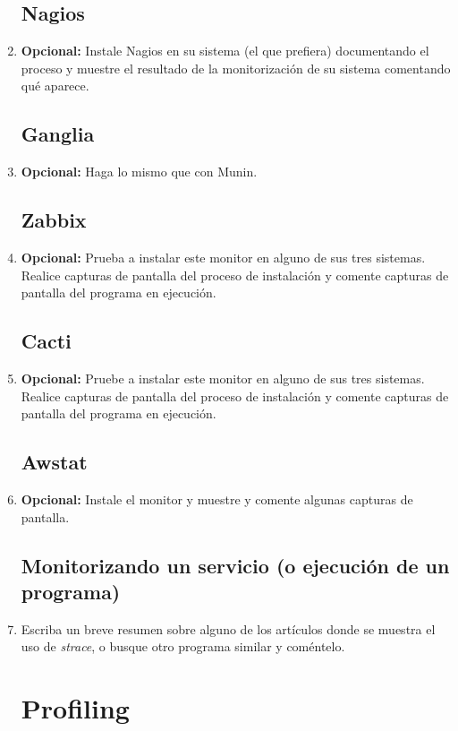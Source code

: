 \documentclass[paper=a4, fontsize=11pt]{scrartcl} %
\numberwithin{equation}{section} %
\numberwithin{figure}{section} %
\numberwithin{table}{section} %
\begin{document}
\begin{enumerate}
	\subsection{Nagios}
		\item \textbf{Opcional:} Instale Nagios en su sistema (el que prefiera) documentando el
		proceso y muestre el resultado de la monitorización de su sistema comentando qué aparece.
		
	\subsection{Ganglia}
		\item \textbf{Opcional:} Haga lo mismo que con Munin.
		
	\subsection{Zabbix}
		\item \textbf{Opcional:} Prueba a instalar este monitor en alguno de sus tres sistemas.
		Realice capturas de pantalla del proceso de instalación y comente capturas de pantalla
		del programa en ejecución.
		
	\subsection{Cacti}
		\item \textbf{Opcional:} Pruebe a instalar este monitor en alguno de sus tres sistemas.
		Realice capturas de pantalla del proceso de instalación y comente capturas de pantalla
		del programa en ejecución.
		
	\subsection{Awstat}
		\item \textbf{Opcional:} Instale el monitor y muestre y comente algunas capturas de pantalla.
		
	\subsection{Monitorizando un servicio (o ejecución de un programa)}
		\item Escriba un breve resumen sobre alguno de los artículos donde se muestra el uso de
		\textit{strace}, o busque otro programa similar y coméntelo.
		
	\section{Profiling}

\end{enumerate}
\end{document}
